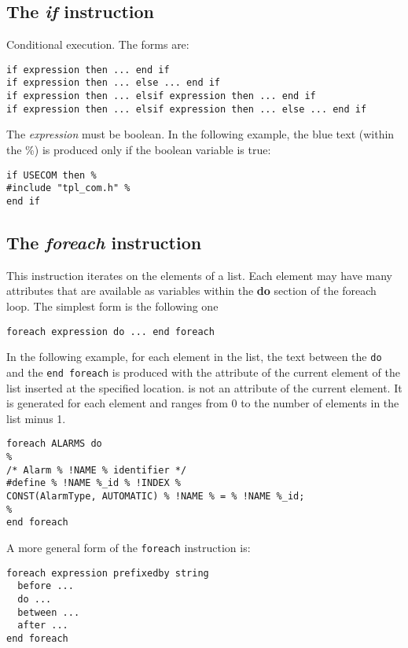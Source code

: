 \subsection{The {\em if} instruction}

Conditional execution. The forms are:

\begin{lstlisting}
if expression then ... end if
if expression then ... else ... end if
if expression then ... elsif expression then ... end if
if expression then ... elsif expression then ... else ... end if
\end{lstlisting}    

The {\em expression} must be boolean. In the following example, the blue text (within the \%) is produced only if the  boolean variable is true:

\begin{lstlisting}
if USECOM then %
#include "tpl_com.h" %
end if
\end{lstlisting}

\subsection{The {\em foreach} instruction}

This instruction iterates on the elements of a list. Each element may have many attributes that are available as variables within the {\bf do} section of the foreach loop. The simplest form is the following one

\begin{lstlisting}
foreach expression do ... end foreach
\end{lstlisting}

In the following example, for each element in the  list, the text between the {\tt do} and the {\tt end foreach} is produced with the  attribute of the current element of the  list inserted at the specified location.  is not an attribute of the current element. It is generated for each element and ranges from 0 to the number of elements in the list minus 1.
\begin{lstlisting}
foreach ALARMS do
%
/* Alarm % !NAME % identifier */
#define % !NAME %_id % !INDEX %
CONST(AlarmType, AUTOMATIC) % !NAME % = % !NAME %_id;
%
end foreach
\end{lstlisting}

A more general form of the {\tt foreach} instruction is:

\begin{lstlisting}
foreach expression prefixedby string
  before ...
  do ...
  between ...
  after ...
end foreach
\end{lstlisting}

